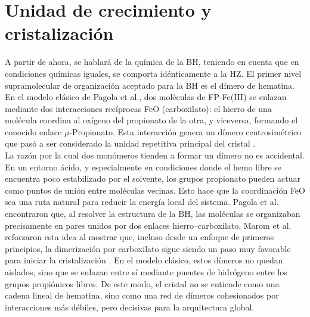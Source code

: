\documentclass[12pt,letterpaper,oneside]{report}
\begin{document}

\section{Unidad de crecimiento y cristalización}\label{sec:GU_cry}


A partir de ahora, se hablará de la química de la BH, teniendo en cuenta que en condiciones químicas iguales, se comporta idénticamente a la HZ. El primer nivel supramolecular de organización aceptado para la BH es el dímero de hematina. En el modelo clásico de Pagola et al., dos moléculas de FP-Fe(III) se enlazan mediante dos interacciones recíprocas Fe\text{-}O (carboxilato): el hierro de una molécula coordina al oxígeno del propionato de la otra, y viceversa, formando el conocido enlace $\mu$-Propionato. Esta interacción genera un dímero centrosimétrico que pasó a ser considerado la unidad repetitiva principal del cristal \cite{PagolaSilvina2000}.\\


La razón por la cual dos monómeros tienden a formar un dímero no es accidental. En un entorno ácido, y especialmente en condiciones donde el hemo libre se encuentra poco estabilizado por el solvente, los grupos propionato pueden actuar como puntos de unión entre moléculas vecinas. Esto hace que la coordinación FeO sea una ruta natural para reducir la energía local del sistema. Pagola et al. encontraron que, al resolver la estructura de la BH, las moléculas se organizaban precisamente en pares unidos por dos enlaces hierro–carboxilato. Marom et al. reforzaron esta idea al mostrar que, incluso desde un enfoque de primeros principios, la dimerización por carboxilato sigue siendo un paso muy favorable para iniciar la cristalización \cite{PagolaSilvina2000, Marom2011}. En el modelo clásico, estos dímeros no quedan aislados, sino que se enlazan entre sí mediante puentes de hidrógeno entre los grupos propiónicos libres. De este modo, el cristal no se entiende como una cadena lineal de hematina, sino como una red de dímeros cohesionados por interacciones más débiles, pero decisivas para la arquitectura global.\\
\end{document}
